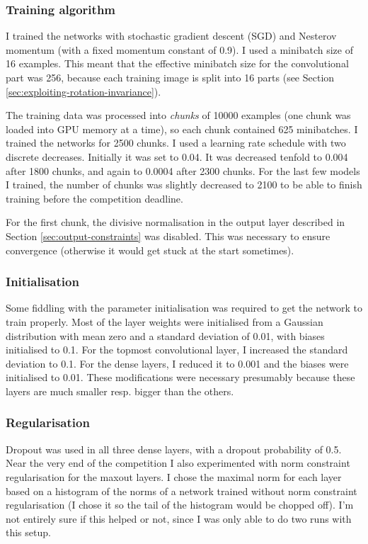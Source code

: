 \documentclass[a4paper,10pt]{article}
\begin{document}
\subsubsection{Training algorithm}

I trained the networks with stochastic gradient descent (SGD) and Nesterov momentum (with a fixed momentum constant of 0.9). I used a minibatch size of 16 examples. This meant that the effective minibatch size for the convolutional part was 256, because each training image is split into 16 parts (see Section \ref{sec:exploiting-rotation-invariance}).

The training data was processed into \textit{chunks} of 10000 examples (one chunk was loaded into GPU memory at a time), so each chunk contained 625 minibatches. I trained the networks for 2500 chunks. I used a learning rate schedule with two discrete decreases. Initially it was set to 0.04. It was decreased tenfold to 0.004 after 1800 chunks, and again to 0.0004 after 2300 chunks. For the last few models I trained, the number of chunks was slightly decreased to 2100 to be able to finish training before the competition deadline.

For the first chunk, the divisive normalisation in the output layer described in Section \ref{sec:output-constraints} was disabled. This was necessary to ensure convergence (otherwise it would get stuck at the start sometimes).

\subsubsection{Initialisation}

Some fiddling with the parameter initialisation was required to get the network to train properly. Most of the layer weights were initialised from a Gaussian distribution with mean zero and a standard deviation of 0.01, with biases initialised to 0.1. For the topmost convolutional layer, I increased the standard deviation to 0.1. For the dense layers, I reduced it to 0.001 and the biases were initialised to 0.01. These modifications were necessary presumably because these layers are much smaller resp. bigger than the others.

\subsubsection{Regularisation}
Dropout was used in all three dense layers, with a dropout probability of 0.5. Near the very end of the competition I also experimented with norm constraint regularisation for the maxout layers. I chose the maximal norm for each layer based on a histogram of the norms of a network trained without norm constraint regularisation (I chose it so the tail of the histogram would be chopped off). I'm not entirely sure if this helped or not, since I was only able to do two runs with this setup.
\end{document}
